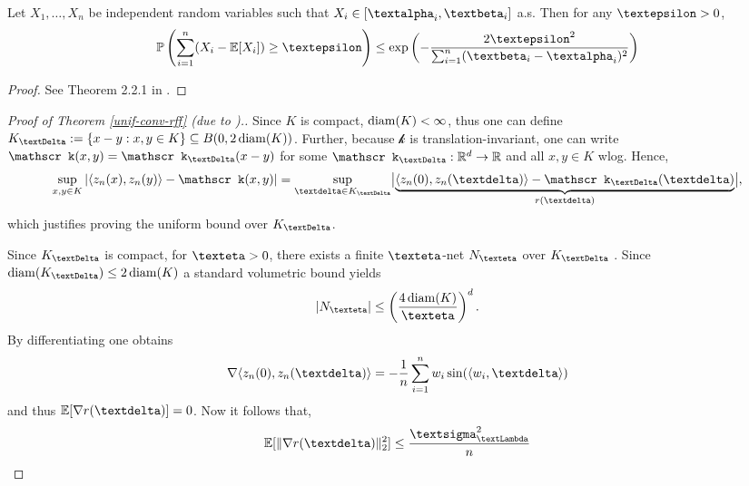 \documentclass[openany]{book}
\begin{document}
\begin{theorem}
    Let $X_1,\dots,X_n$ be independent random variables such that $X_i\in [\galpha_i,\gbeta_i]$ a.s. Then for any $\gepsilon>0$,
    \begin{equation*}
        \mathbb P\left(\sum_{i=1}^n(X_i-\mathbb E[X_i])\geq \gepsilon\right)\leq \exp\left(-\frac{2\gepsilon^2}{\sum_{i=1}^n(\gbeta_i-\galpha_i)^2}\right)
    \end{equation*}
    \begin{proof}
        See Theorem 2.2.1 in \cite{vershynin2018}.
    \end{proof}
\end{theorem}
\begin{proof}[Proof of Theorem \ref{unif-conv-rff} (due to \cite{rahimi2007}).]
    Since $K$ is compact, $\operatorname{diam}(K)<\infty$, thus one can define $K_{\gDelta}:=\{x-y:x,y\in K\}\subseteq B(0,2\diam(K))$. Further, because $\mathscr k$ is translation-invariant, one can write $\mathscr k(x,y)=\mathscr k_{\gDelta}(x-y)$ for some $\mathscr k_{\gDelta}:\mathbb R^d\to \mathbb R$ and all $x,y\in K$ wlog. Hence, 
    \begin{equation*}
        \sup_{x,y\in K}\left\vert \langle z_{n}(x),z_{n}(y)\rangle -\mathscr k(x,y) \right\vert=\sup_{\gdelta \in K_{\gDelta}}\bigl\vert \underbrace{\langle z_n(0),z_n(\gdelta)\rangle -\mathscr k_{\gDelta}(\gdelta)}_{r(\gdelta)} \bigr\vert,
    \end{equation*}
    which justifies proving the uniform bound over $K_{\gDelta}$. 
    \par Since $K_{\gDelta}$ is compact, for $\geta>0$, there exists a finite $\geta$-net $N_{\geta}$ over $K_{\gDelta}$ \cite{clements1963}. Since $\diam(K_{\gDelta})\leq 2\diam(K)$ a standard volumetric bound \cite{cucker2001} yields
    \begin{equation}\label{rff_vol_bound}
        \vert N_{\geta}\vert \leq \left(\frac{4\diam(K)}{\geta}\right)^d.
    \end{equation}
    By differentiating one obtains
    \begin{equation*}
        \nabla \langle z_n(0),z_n(\gdelta)\rangle =-\frac{1}{n}\sum_{i=1}^nw_i\sin(\langle w_i,\gdelta\rangle)
    \end{equation*}
    and thus $\mathbb E[\nabla r(\gdelta)]=0$. Now it follows that,
    \begin{equation}\label{rff_rem_bound}
        \mathbb E[\|\nabla r(\gdelta)\|^2_2]\leq \frac{\gsigma_{\gLambda}^2}{n}
    \end{equation}

\end{proof}
\end{document}
